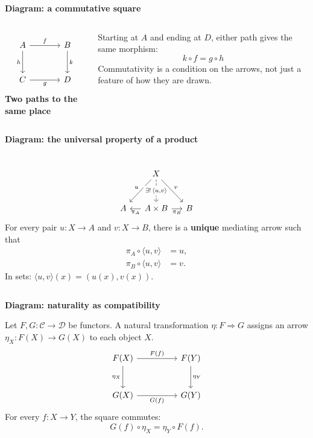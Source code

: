 \documentclass[aspectratio=169]{beamer}
\newcommand{\slideheading}[1]{%
    {\small\bfseries\color{slideMuted}#1\par}
    \vspace{1em}
}
\begin{document}
\begin{frame}
    \slideheading{Diagram: a commutative square}
    \begin{columns}[c,onlytextwidth]
        \[
        \begin{tikzcd}[ampersand replacement=\&,row sep=large,column sep=large]
            A \arrow[r,"f"] \arrow[d,"h"'] \&
            B \arrow[d,"k"] \\
            C \arrow[r,"g"'] \& D
        \end{tikzcd}
        \]
        {\large\bfseries\color{slideBlue}Two paths to the same place}\par
        Starting at $A$ and ending at $D$, either path gives the same morphism:
        \[
            \boxed{k\circ f=g\circ h}
        \]
        Commutativity is a condition on the arrows, not just a feature of
        how they are drawn.
    \end{columns}
\end{frame}

\begin{frame}
    \slideheading{Diagram: the universal property of a product}
    \begin{columns}[c,onlytextwidth]
        \[
        \begin{tikzcd}[ampersand replacement=\&,column sep=1.3em,row sep=large]
            \& X
                \arrow[dl,"u"']
                \arrow[d,dashed,"{\exists!\,\langle u,v\rangle}" description]
                \arrow[dr,"v"] \& \\
            A \& A\times B \arrow[l,"\pi_A"] \arrow[r,"\pi_B"'] \& B
        \end{tikzcd}
        \]
        For every pair $u:X\to A$ and $v:X\to B$, there is a
        \textbf{unique} mediating arrow such that
        \[
            \begin{aligned}
                \pi_A\circ\langle u,v\rangle&=u,\\
                \pi_B\circ\langle u,v\rangle&=v.
            \end{aligned}
        \]
        {\small In sets: $\langle u,v\rangle(x)=(u(x),v(x))$.}
    \end{columns}
\end{frame}

\begin{frame}
    \slideheading{Diagram: naturality as compatibility}
    Let $F,G:\mathcal{C}\to\mathcal{D}$ be functors.
    A natural transformation $\eta:F\Rightarrow G$ assigns an arrow
    $\eta_X:F(X)\to G(X)$ to each object $X$.
    \[
    \begin{tikzcd}[ampersand replacement=\&,row sep=large,column sep=huge]
        F(X) \arrow[r,"F(f)"] \arrow[d,"\eta_X"'] \&
        F(Y) \arrow[d,"\eta_Y"] \\
        G(X) \arrow[r,"G(f)"'] \& G(Y)
    \end{tikzcd}
    \]
    For every $f:X\to Y$, the square commutes:
    \[
        G(f)\circ\eta_X=\eta_Y\circ F(f).
    \]
\end{frame}
\end{document}
